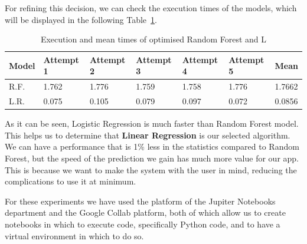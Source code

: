 For refining this decision, we can check the execution times of the models, which will be displayed in the following Table~\ref{tab:timestatistics}.

\begin{table}[h]
\begin{tabular}{|l|l|l|l|l|l|l|}
\hline
\textbf{Model}      & \textbf{Attempt 1} & \textbf{Attempt 2} & \textbf{Attempt 3} & \textbf{Attempt 4} & \textbf{Attempt 5} & \textbf{Mean} \\ \hline
R.F.       & 1.762              & 1.776              & 1.759              & 1.758              & 1.776              & 1.7662             \\ \hline
L.R. & 0.075              & 0.105              & 0.079              & 0.097              & 0.072              & 0.0856             \\ \hline
\end{tabular}
\caption{Execution and mean times of optimised Random Forest and L}
\label{tab:timestatistics}
\end{table}

As it can be seen, Logistic Regression is much faster than Random Forest model. This helps us to determine that \textbf{Linear Regression} is our selected algorithm. We can have a performance that is 1\% less in the statistics compared to Random Forest, but the speed of the prediction we gain has much more value for our app. This is because we want to make the system with the user in mind, reducing the complications to use it at minimum.

For these experiments we have used the platform of the Jupiter Notebooks department and the Google Collab platform, both of which allow us to create notebooks in which to execute code, specifically Python code, and to have a virtual environment in which to do so.